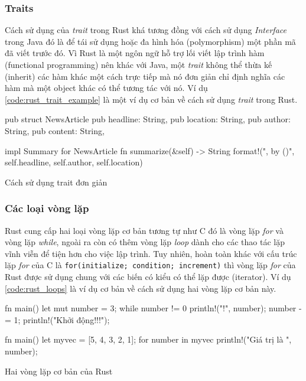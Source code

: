 \subsubsection{Traits}
Cách sử dụng của \emph{trait} trong Rust khá tương đồng với cách sử dụng \emph{Interface} trong Java đó là để tái sử dụng hoặc đa hình hóa (polymorphism) một phần mã đã viết trước đó.
Vì Rust là một ngôn ngữ hỗ trợ lối viết lập trình hàm (functional programming) nên khác với Java, một \emph{trait} không thể thừa kế (inherit) các hàm khác một cách trực tiếp mà nó đơn giản chỉ định nghĩa các hàm mà một object khác có thể tương tác với nó.
Ví dụ \ref{code:rust_trait_example} là một ví dụ cơ bản về cách sử dụng \emph{trait} trong Rust.
\begin{listing}[ht]
\begin{rustcode}
pub struct NewsArticle {
    pub headline: String,
    pub location: String,
    pub author: String,
    pub content: String,
}

impl Summary for NewsArticle {
    fn summarize(&self) -> String {
        format!("{}, by {} ({})", self.headline, self.author, self.location)
    }
}
\end{rustcode}
\caption{Cách sử dụng trait đơn giản}
\label{code:rust_trait_example}
\end{listing}

\subsubsection{Các loại vòng lặp}
Rust cung cấp hai loại vòng lặp cơ bản tương tự như C đó là vòng lặp \emph{for} và vòng lặp \emph{while}, ngoài ra còn có thêm vòng lặp \emph{loop} dành cho các thao tác lặp vĩnh viễn để tiện hơn cho việc lập trình.
Tuy nhiên, hoàn toàn khác với cấu trúc lặp \emph{for} của C là \texttt{for(initialize; condition; increment)} thì vòng lặp \emph{for} của Rust được sử dụng chung với các biến có kiểu có thể lặp được (iterator).
Ví dụ \ref{code:rust_loops} là ví dụ cơ bản về cách sử dụng hai vòng lặp cơ bản này.

\begin{center}
\begin{listing}
\begin{minipage}[ht]{0.4\linewidth}
\begin{rustcode}
fn main() {
    let mut number = 3;
    while number != 0 {
        println!("{}!", number);
        number -= 1;
    }
    println!("Khởi động!!!");
}
\end{rustcode}
\end{minipage}
\qquad
\begin{minipage}[ht]{0.5\linewidth}
\begin{rustcode}
fn main() {
    let myvec = [5, 4, 3, 2, 1];
    for number in myvec {
        println!("Giá trị là {}", number);
    }
}
\end{rustcode}
\end{minipage}
\caption{Hai vòng lặp cơ bản của Rust}
\label{code:rust_loops}
\end{listing}
\end{center}

